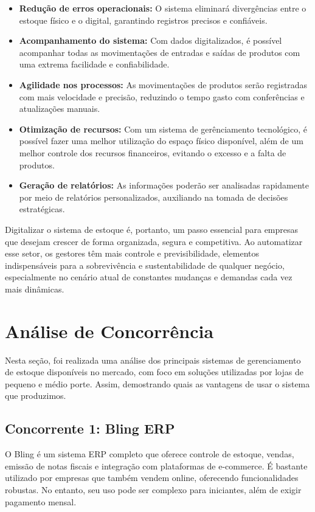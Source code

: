 \documentclass[
	12pt,				%
	openany,			%
	twoside,			%
	a4paper,			%
	english,			%
	brazil				%
	]{abntex2}
\begin{document}
\begin{itemize}
    \item \textbf{Redução de erros operacionais:} O sistema eliminará divergências entre o estoque físico e o digital, garantindo registros precisos e confiáveis.
    \item \textbf{Acompanhamento do sistema:} Com dados digitalizados, é possível acompanhar todas as movimentações de entradas e saídas de produtos com uma extrema facilidade e confiabilidade.
    \item \textbf{Agilidade nos processos:} As movimentações de produtos serão registradas com mais velocidade e precisão, reduzindo o tempo gasto com conferências e atualizações manuais.
    \item \textbf{Otimização de recursos:} Com um sistema de gerênciamento tecnológico, é possível fazer uma melhor utilização do espaço físico disponível, além de um melhor controle dos recursos financeiros, evitando o excesso e a falta de produtos.
    \item \textbf{Geração de relatórios:} As informações poderão ser analisadas rapidamente por meio de relatórios personalizados, auxiliando na tomada de decisões estratégicas.
\end{itemize}

Digitalizar o sistema de estoque é, portanto, um passo essencial para empresas que desejam crescer de forma organizada, segura e competitiva. Ao automatizar esse setor, os gestores têm mais controle e previsibilidade, elementos indispensáveis para a sobrevivência e sustentabilidade de qualquer negócio, especialmente no cenário atual de constantes mudanças e demandas cada vez mais dinâmicas.

\section{Análise de Concorrência}

Nesta seção, foi realizada uma análise dos principais sistemas de gerenciamento de estoque disponíveis no mercado, com foco em soluções utilizadas por lojas de pequeno e médio porte. Assim, demostrando quais as vantagens de usar o sistema que produzimos.

\subsection{Concorrente 1: Bling ERP}
O Bling é um sistema ERP completo que oferece controle de estoque, vendas, emissão de notas fiscais e integração com plataformas de e-commerce. É bastante utilizado por empresas que também vendem online, oferecendo funcionalidades robustas. No entanto, seu uso pode ser complexo para iniciantes, além de exigir pagamento mensal.
\end{document}
